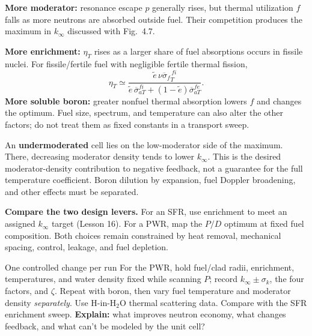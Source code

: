\documentclass{ne630handout}
\begin{document}
\textbf{More moderator:} resonance escape $p$ generally rises, but thermal utilization $f$ falls as more neutrons are absorbed outside fuel. Their competition produces the maximum in $k_\infty$ discussed with Fig.\ 4.7.

\textbf{More enrichment:} $\eta_T$ rises as a larger share of fuel absorptions occurs in fissile nuclei. For fissile/fertile fuel with negligible fertile thermal fission,
\[
 \eta_T\simeq
 \frac{\widetilde e\,\overline{\nu\sigma_f}^{\,fi}_{T}}
 {\widetilde e\,\overline\sigma_{aT}^{fi}
 +(1-\widetilde e)\overline\sigma_{aT}^{fe}}.
\]
\textbf{More soluble boron:} greater nonfuel thermal absorption lowers $f$ and changes the optimum. Fuel size, spectrum, and temperature can also alter the other factors; do not treat them as fixed constants in a transport sweep.

An \textbf{undermoderated} cell lies on the low-moderator side of the maximum. There, decreasing moderator density tends to lower $k_\infty$. This is the desired moderator-density contribution to negative feedback, not a guarantee for the full temperature coefficient. Boron dilution by expansion, fuel Doppler broadening, and other effects must be separated.

\textbf{Compare the two design levers.} For an SFR, use enrichment to meet an assigned $k_\infty$ target (Lesson 16). For a PWR, map the $P/D$ optimum at fixed fuel composition. Both choices remain constrained by heat removal, mechanical spacing, control, leakage, and fuel depletion.
\colend
\begin{OpenMCExplore}{One controlled change per run}
For the PWR, hold fuel/clad radii, enrichment, temperatures, and water density fixed while scanning $P$; record $k_\infty\pm\sigma_k$, the four factors, and $\zeta$. Repeat with boron, then vary fuel temperature and moderator density \emph{separately}. Use H-in-H$_2$O thermal scattering data. Compare with the SFR enrichment sweep. \textbf{Explain:} what improves neutron economy, what changes feedback, and what can't be modeled by the unit cell?
\end{OpenMCExplore}
\end{document}
